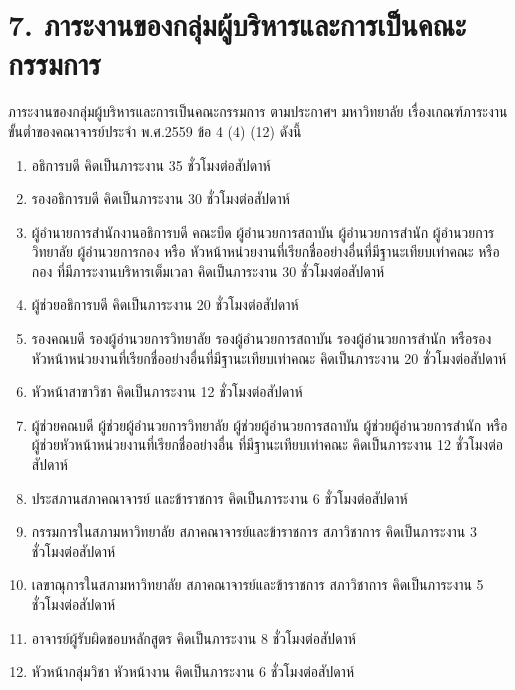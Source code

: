\documentclass[a4paper,12pt,english]{sphinxmanual}
\begin{document}
\chapter{7. ภาระงานของกลุ่มผู้บริหารและการเป็นคณะกรรมการ}
\label{\detokenize{7executive:id1}}\label{\detokenize{7executive::doc}}
ภาระงานของกลุ่มผู้บริหารและการเป็นคณะกรรมการ ตามประกาศฯ มหาวิทยาลัย เรื่องเกณฑ์ภาระงานขั้นต่ำของคณาจารย์ประจำ พ.ศ.2559 ข้อ 4 (4) \sphinxhyphen{} (12) ดังนี้
\begin{enumerate}
%
\item {} 
อธิการบดี คิดเป็นภาระงาน 35 ชั่วโมงต่อสัปดาห์

\item {} 
รองอธิการบดี คิดเป็นภาระงาน 30 ชั่วโมงต่อสัปดาห์

\item {} 
ผู้อำนายการสำนักงานอธิการบดี คณะบีด ผู้อำนวยการสถาบัน ผู้อำนวยการสำนัก ผู้อำนวยการวิทยาลัย ผู้อำนวยการกอง หรือ หัวหน้าหน่วยงานที่เรียกชื่ออย่างอื่นที่มีฐานะเทียบเท่าคณะ หรือกอง ที่มีภาระงานบริหารเต็มเวลา คิดเป็นภาระงาน 30 ชั่วโมงต่อสัปดาห์

\item {} 
ผู้ช่วยอธิการบดี คิดเป็นภาระงาน 20 ชั่วโมงต่อสัปดาห์

\item {} 
รองคณบดี รองผู้อำนวยการวิทยาลัย รองผู้อำนวยการสถาบัน รองผู้อำนวยการสำนัก หรือรองหัวหน้าหน่วยงานที่เรียกชื่ออย่างอื่นที่มีฐานะเทียบเท่าคณะ คิดเป็นภาระงาน 20 ชั่วโมงต่อสัปดาห์

\item {} 
หัวหน้าสาขาวิชา คิดเป็นภาระงาน 12 ชั่วโมงต่อสัปดาห์

\item {} 
ผู้ช่วยคณบดี ผู้ช่วยผู้อำนวยการวิทยาลัย ผู้ช่วยผู้อำนวยการสถาบัน ผู้ช่วยผู้อำนวยการสำนัก หรือผู้ช่วยหัวหน้าหน่วยงานที่เรียกชื่ออย่างอื่น ที่มีฐานะเทียบเท่าคณะ คิดเป็นภาระงาน 12 ชั่วโมงต่อสัปดาห์

\item {} 
ประสภานสภาคณาจารย์ และข้าราชการ คิดเป็นภาระงาน 6 ชั่วโมงต่อสัปดาห์

\item {} 
กรรมการในสภามหาวิทยาลัย สภาคณาจารย์และข้าราชการ สภาวิชาการ คิดเป็นภาระงาน 3 ชั่วโมงต่อสัปดาห์

\item {} 
เลขาณุการในสภามหาวิทยาลัย สภาคณาจารย์และข้าราชการ สภาวิชาการ คิดเป็นภาระงาน 5 ชั่วโมงต่อสัปดาห์

\item {} 
อาจารย์ผู้รับผิดชอบหลักสูตร คิดเป็นภาระงาน 8 ชั่วโมงต่อสัปดาห์

\item {} 
หัวหน้ากลุ่มวิชา หัวหน้างาน คิดเป็นภาระงาน 6 ชั่วโมงต่อสัปดาห์

\end{enumerate}
\end{document}
